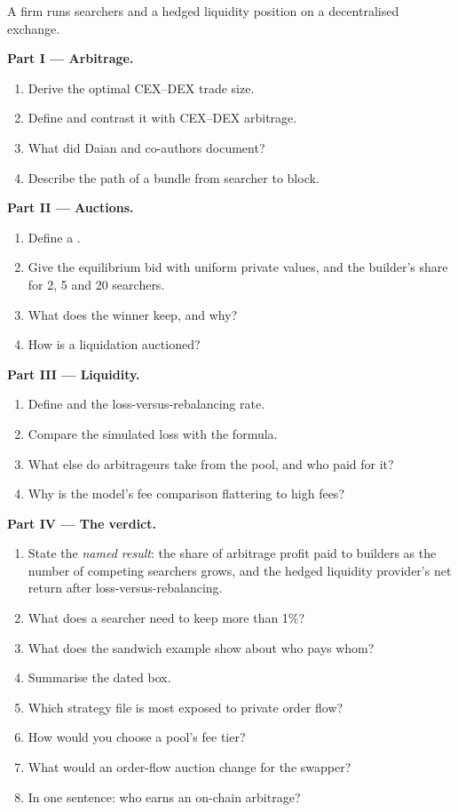 \begin{problem}\label{pb:hf:on-chain-trading:1}
A firm runs searchers and a hedged liquidity position on a decentralised exchange.

\medskip\noindent\textbf{Part I --- Arbitrage.}
\begin{enumerate}
\item Derive the optimal CEX--DEX trade size.
\item Define  and contrast it with CEX--DEX arbitrage.
\item What did Daian and co-authors document?
\item Describe the path of a bundle from searcher to block.
\end{enumerate}

\medskip\noindent\textbf{Part II --- Auctions.}
\begin{enumerate}[resume]
\item Define a .
\item Give the equilibrium bid with uniform private values, and the builder's share for 2, 5 and 20 searchers.
\item What does the winner keep, and why?
\item How is a liquidation auctioned?
\end{enumerate}

\medskip\noindent\textbf{Part III --- Liquidity.}
\begin{enumerate}[resume]
\item Define  and the loss-versus-rebalancing rate.
\item Compare the simulated loss with the formula.
\item What else do arbitrageurs take from the pool, and who paid for it?
\item Why is the model's fee comparison flattering to high fees?
\end{enumerate}

\medskip\noindent\textbf{Part IV --- The verdict.}
\begin{enumerate}[resume]
\item State the \emph{named result}: the share of arbitrage profit paid to builders as the number of competing searchers grows, and the hedged
liquidity provider's net return after loss-versus-rebalancing.
\item What does a searcher need to keep more than 1\%?
\item What does the sandwich example show about who pays whom?
\item Summarise the dated box.
\item Which strategy file is most exposed to private order flow?
\item How would you choose a pool's fee tier?
\item What would an order-flow auction change for the swapper?
\item In one sentence: who earns an on-chain arbitrage?
\end{enumerate}
\end{problem}

